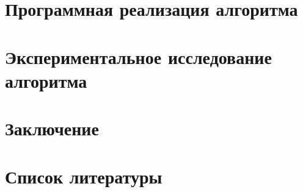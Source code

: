 \documentclass[12pt]{article}
\begin{document}
\newpage
\section{Программная реализация алгоритма}

\newpage
\section{Экспериментальное исследование алгоритма}

\newpage
\section{Заключение}

\newpage
\section*{Список литературы}

\printbibliography
\end{document}
